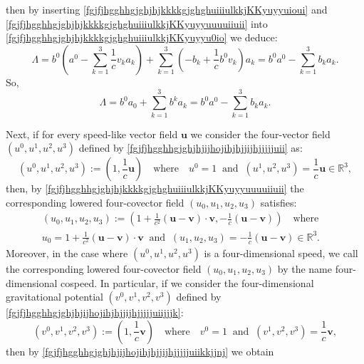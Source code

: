 \documentclass{article}
\theoremstyle{definition}
\theoremstyle{remark}
\renewcommand{\vec}[1]{\mathbf{#1}}
\newcommand{\er}{\eqref}
\newcommand{\er}{\eqref}
\begin{document}
then by inserting
\er{fgjfjhgghhgjghjhjkkkkgjghghuiiiulkkjKKyuyyuioui} and
\er{fgjfjhgghhgjghjhjkkkkgjghghuiiiulkkjKKyuyyuuuuiiuii} into
\er{fgjfjhgghhgjghjhjkkkkgjghghuiiiulkkjKKyuyyu0io} we deduce:
\begin{equation}\label{fgjfjhgghhgjghjhjkkkkgjghghuiiiulkkjKKyuyyu0ioioio}
\Lambda=b^0\left(a^0-\sum_{k=1}^{3}\frac{1}{c}v_ka_k\right)+\sum_{k=1}^{3}\left(-b_{k}+\frac{1}{c}b^0v_k\right)a_k=b^0a^0-\sum_{k=1}^{3}b_{k}a_k.
\end{equation}
So,
\begin{equation}\label{fgjfjhgghhgjghjhjkkkkgjghghuiiiulkkjKKyuyyu0ioioiogghghgh}
\Lambda=b^0a_0+\sum_{k=1}^{3}b^ka_k=b^0a^0-\sum_{k=1}^{3}b_{k}a_k.
\end{equation}

Next, if for every speed-like vector field $\vec u$ we consider the
four-vector field $(u^0,u^1,u^2,u^3)$ defined by
\er{fgjfjhgghhgjghjhjijhojihjhjjijhjjjjjuii} as:
\begin{equation}\label{fgjfjhgghhgjghjhjijhojihjhjjijhjjjjjuiikkj}
(u^0,u^1,u^2,u^3):=\left(1,\frac{1}{c}\vec
u\right)\quad\text{where}\quad
u^0=1\;\;\text{and}\;\;(u^1,u^2,u^3)=\frac{1}{c}\vec
u\in\mathbb{R}^3,
\end{equation}
then, by \er{fgjfjhgghhgjghjhjkkkkgjghghuiiiulkkjKKyuyyuuuuiiuii}
the corresponding lowered four-covector field $(u_0,u_1,u_2,u_3)$
satisfies:
\begin{multline}\label{fgjfjhgghhgjghjhjijhojihjhjjijhjjjjjuiikkjjnj}
(u_0,u_1,u_2,u_3):=\left(1+\frac{1}{c^2}\left(\vec u-\vec
v\right)\cdot\vec v,-\frac{1}{c}\left(\vec u-\vec
v\right)\right)\quad\text{where}\quad\\
u_0=1+\frac{1}{c^2}\left(\vec u-\vec v\right)\cdot\vec
v\;\;\text{and}\;\;(u_1,u_2,u_3)=-\frac{1}{c}\left(\vec u-\vec
v\right)\in\mathbb{R}^3.
\end{multline}
Moreover, in the case where $(u^0,u^1,u^2,u^3)$  is a
four-dimensional speed, we call the corresponding lowered
four-covector field $(u_0,u_1,u_2,u_3)$ by the name four-dimensional
cospeed. In particular, if we consider the four-dimensional
gravitational potential $(v^0,v^1,v^2,v^3)$ defined by
\er{fgjfjhgghhgjghjhjijhojihjhjjijhjjjjjuiijjjk}:
\begin{equation}\label{fgjfjhgghhgjghjhjijhojihjhjjijhjjjjjuiijjjkhjhjhj}
(v^0,v^1,v^2,v^3):=\left(1,\frac{1}{c}\vec
v\right)\quad\text{where}\quad
v^0=1\;\;\text{and}\;\;(v^1,v^2,v^3)=\frac{1}{c}\vec v,
\end{equation}
then by \er{fgjfjhgghhgjghjhjijhojihjhjjijhjjjjjuiikkjjnj} we obtain
\end{document}
